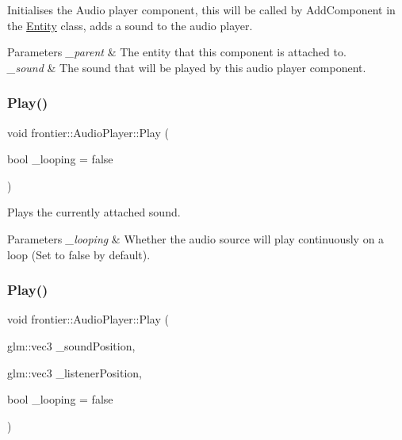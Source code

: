 Initialises the Audio player component, this will be called by Add\+Component in the \hyperlink{classfrontier_1_1_entity}{Entity} class, adds a sound to the audio player. 


\begin{DoxyParams}{Parameters}
{\em \+\_\+parent} & The entity that this component is attached to. \\
\hline
{\em \+\_\+sound} & The sound that will be played by this audio player component. \\
\hline
\end{DoxyParams}
\mbox{\label{classfrontier_1_1_audio_player_ad5791ca0776113116a815f86bd630ad7}} 
\subsubsection{\texorpdfstring{Play()}{Play()}\hspace{0.1cm}{\footnotesize\ttfamily [1/2]}}
{\footnotesize\ttfamily void frontier\+::\+Audio\+Player\+::\+Play (\begin{DoxyParamCaption}\item[{bool}]{\+\_\+looping = {\ttfamily false} }\end{DoxyParamCaption})}



Plays the currently attached sound. 


\begin{DoxyParams}{Parameters}
{\em \+\_\+looping} & Whether the audio source will play continuously on a loop (Set to false by default). \\
\hline
\end{DoxyParams}
\mbox{\label{classfrontier_1_1_audio_player_a757be1bd81df8c3885b03177946b38d1}} 
\subsubsection{\texorpdfstring{Play()}{Play()}\hspace{0.1cm}{\footnotesize\ttfamily [2/2]}}
{\footnotesize\ttfamily void frontier\+::\+Audio\+Player\+::\+Play (\begin{DoxyParamCaption}\item[{glm\+::vec3}]{\+\_\+sound\+Position,  }\item[{glm\+::vec3}]{\+\_\+listener\+Position,  }\item[{bool}]{\+\_\+looping = {\ttfamily false} }\end{DoxyParamCaption})}



